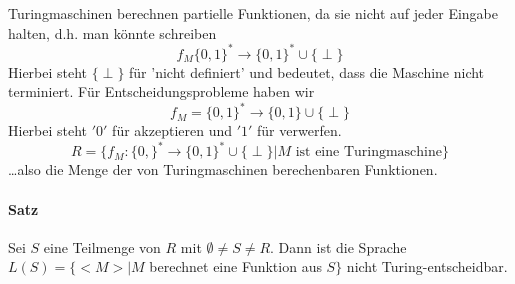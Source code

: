 Turingmaschinen berechnen partielle Funktionen, da sie nicht auf jeder Eingabe halten, d.h. man könnte schreiben $$ f_M\{0,1\}^* \rightarrow \{0,1\}^*\cup\{\perp\} $$ Hierbei steht $\{\perp\}$ für 'nicht definiert' und bedeutet, dass die Maschine nicht terminiert. Für Entscheidungsprobleme haben wir $$ f_M=\{0,1\}^* \rightarrow \{0,1\}\cup\{\perp\}$$ Hierbei steht $'0'$ für akzeptieren und $'1'$ für verwerfen. $$ R=\{  f_M:\{0,\}^* \rightarrow \{0,1\}^*\cup\{\perp\}|M \text{ ist eine Turingmaschine}\} $$ \dots also die Menge der von Turingmaschinen berechenbaren Funktionen.

\paragraph*{Satz} Sei $S$ eine Teilmenge von $R$ mit $\emptyset\not=S\not=R$. Dann ist die Sprache $L(S)=\{<M>|M$ berechnet eine Funktion aus $S\}$ nicht Turing-entscheidbar.

